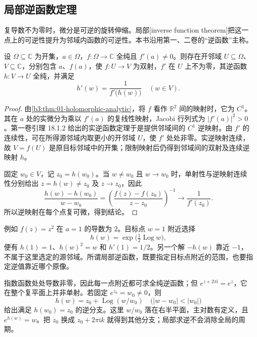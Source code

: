 \subsection{局部逆函数定理}
\label{b3:subsec:010403}

复导数不为零时，微分是可逆的旋转伸缩。局部[inverse function theorem]把这一点上的可逆性提升为邻域内函数的可逆性。本书沿用第一、二卷的“逆函数”主称。

\begin{theorem}[局部逆函数]\label{b3:thm:01-local-inverse}
设 \(\Omega\subseteq\mathbb C\) 为开集，\(a\in\Omega\)，\(f:\Omega\to\mathbb C\) 全纯且 \(f'(a)\neq0\)。则存在开邻域 \(U\subseteq\Omega\)、\(V\subseteq\mathbb C\)，分别包含 \(a\)、\(f(a)\)，使 \(f:U\to V\) 为双射，\(f'\) 在 \(U\) 上不为零，其逆函数 \(h:V\to U\) 全纯，并满足
\[
h'(w)=\frac1{f'\bigl(h(w)\bigr)}\quad(w\in V).
\]
\end{theorem}
\begin{proof}
由\cref{b3:thm:01-holomorphic-analytic}，将 \(f\) 看作 \(\mathbb R^2\) 间的映射时，它为 \(C^1\)。其在 \(a\) 处的实微分为乘以 \(f'(a)\) 的复线性映射，Jacobi 行列式为 \(|f'(a)|^2>0\)。第一卷引理 18.1.2 给出的实逆函数定理于是提供邻域间的 \(C^1\) 逆映射。由 \(f'\) 的连续性，可在所得源邻域内取更小的开邻域 \(U\)，使 \(f'\) 处处非零。实逆映射连续，故 \(V=f(U)\) 是原目标邻域中的开集；限制映射后仍得到邻域间的双射及连续逆映射 \(h\)。

固定 \(w_0\in V\)，记 \(z_0=h(w_0)\)。当 \(w\neq w_0\) 且 \(w\to w_0\) 时，单射性与逆映射连续性分别给出 \(z=h(w)\ne z_0\) 及 \(z\to z_0\)，因此
\[
\frac{h(w)-h(w_0)}{w-w_0}
=\left(\frac{f(z)-f(z_0)}{z-z_0}\right)^{-1}
\longrightarrow\frac1{f'(z_0)}.
\]
所以逆映射在每个点复可微，得到结论。
\end{proof}

例如 \(f(z)=z^2\) 在 \(a=1\) 的导数为 \(2\)。目标点 \(w=1\) 附近选择
\[
 h(w)=\exp\bigl(\tfrac12\operatorname{Log}w\bigr),
\]
便有 \(h(1)=1\)、\(h(w)^2=w\) 和 \(h'(1)=1/2\)。另一个解 \(-h(w)\) 靠近 \(-1\)，不属于这里选定的源邻域。所谓局部逆函数，既要指定目标点附近的范围，也要指定逆值靠近哪个原像。

\ProseParagraphBreak

指数函数处处导数非零，因此每一点附近都可求全纯逆函数；但 \(e^{z+2\pi\mathrm{i}}=e^z\)，它在整个复平面上并非单射。若固定 \(e^{z_0}=w_0\ne0\)，则
\[
 h(w)=z_0+\operatorname{Log}(w/w_0)
 \quad\bigl(|w-w_0|<|w_0|\bigr)
\]
给出满足 \(h(w_0)=z_0\) 的逆分支。这里 \(w/w_0\) 落在右半平面，主对数有定义，且 \(e^{h(w)}=w\)。把 \(z_0\) 换成 \(z_0+2\pi\mathrm{i}k\) 就得到其他分支；局部求逆不会消除全局的周期。

